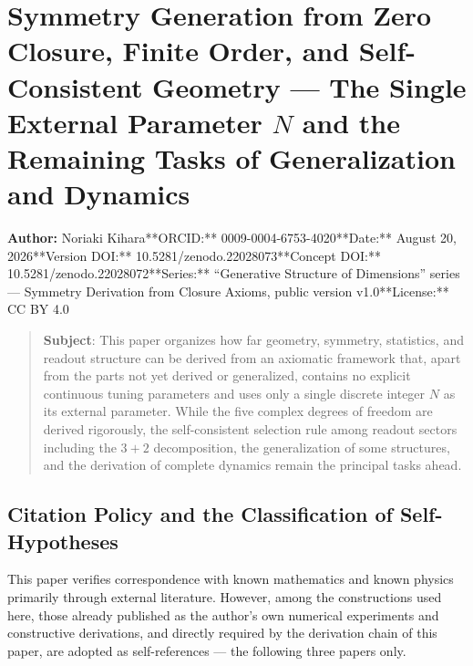 \documentclass[
  a4paper,
]{article}
\author{}
\date{}
\begin{document}
\section{\texorpdfstring{Symmetry Generation from Zero Closure, Finite
Order, and Self-Consistent Geometry --- The Single External Parameter
\(N\) and the Remaining Tasks of Generalization and
Dynamics}{Symmetry Generation from Zero Closure, Finite Order, and Self-Consistent Geometry --- The Single External Parameter N and the Remaining Tasks of Generalization and Dynamics}}\label{symmetry-generation-from-zero-closure-finite-order-and-self-consistent-geometry-the-single-external-parameter-n-and-the-remaining-tasks-of-generalization-and-dynamics}

\textbf{Author:} Noriaki Kihara**ORCID:** 0009-0004-6753-4020**Date:**
August 20, 2026**Version DOI:** 10.5281/zenodo.22028073**Concept DOI:**
10.5281/zenodo.22028072**Series:** ``Generative Structure of
Dimensions'' series --- Symmetry Derivation from Closure Axioms, public
version v1.0**License:** CC BY 4.0

\begin{quote}
\textbf{Subject}: This paper organizes how far geometry, symmetry,
statistics, and readout structure can be derived from an axiomatic
framework that, apart from the parts not yet derived or generalized,
contains no explicit continuous tuning parameters and uses only a single
discrete integer \(N\) as its external parameter. While the five complex
degrees of freedom are derived rigorously, the self-consistent selection
rule among readout sectors including the \(3+2\) decomposition, the
generalization of some structures, and the derivation of complete
dynamics remain the principal tasks ahead.
\end{quote}

\subsection{Citation Policy and the Classification of
Self-Hypotheses}\label{citation-policy-and-the-classification-of-self-hypotheses}

This paper verifies correspondence with known mathematics and known
physics primarily through external literature. However, among the
constructions used here, those already published as the author's own
numerical experiments and constructive derivations, and directly
required by the derivation chain of this paper, are adopted as
self-references --- the following three papers only.
\end{document}
